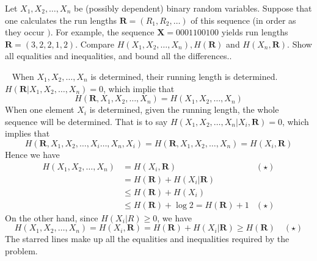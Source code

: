 \begin{exercise}{Let $X_{1}, X_{2}, \ldots, X_{n}$ be (possibly dependent) binary random variables. Suppose that one calculates the run lengths $\mathbf{R}=\left(R_{1}, R_{2}, \ldots\right)$ of this sequence (in order as they occur $) .$ For example, the sequence $\mathbf{X}=0001100100$ yields run lengths $\mathbf{R}=(3,2,2,1,2) .$ Compare $H\left(X_{1}, X_{2}, \ldots, X_{n}\right), H(\mathbf{R})$ and $H\left(X_{n}, \mathbf{R}\right) .$ Show all equalities and inequalities, and bound all the differences.}.
  \begin{solution}
    \par{~}
    When $X_{1}, X_{2}, \ldots, X_{n}$ is determined, their running length is determined. $H\left(\mathbf{R}| X_{1}, X_{2}, \ldots, X_{n}\right) = 0$, which implie that $$H(\mathbf{R},X_{1}, X_{2}, \ldots, X_{n} ) = H(X_{1}, X_{2}, \ldots, X_{n} ) $$
    When one element $X_{i}$ is determined, given the running length, the whole sequence will be determined.  That is to say $H\left(X_{1}, X_{2}, \ldots, X_{n}| X_i , \mathbf{R} \right) = 0$, which implies that 
    $$H(\mathbf{R},X_{1}, X_{2},\ldots, X_{i} \ldots, X_{n}, X_{i} ) = H(\mathbf{R},X_{1}, X_{2}, \ldots, X_{n}) = H(X_i , \mathbf{R}) $$
    Hence we have
    \begin{equation}
      \begin{aligned}
        H(X_{1}, X_{2}, \ldots, X_{n} ) &= H(X_i,\mathbf{R}) & (\star) \\
        &= H(\mathbf{R}) + H(X_i| \mathbf{R}) \\
        &\le H(\mathbf{R}) + H(X_i) \\
        &\le H(\mathbf{R}) + \log 2 =  H(\mathbf{R}) + 1 & (\star)
      \end{aligned}
    \end{equation}
    On the other hand, since $H(X_i|R) \ge 0$, we have
    \begin{equation}
      H(X_{1}, X_{2}, \ldots, X_{n} ) = H(X_i,\mathbf{R})  = H(\mathbf{R}) + H(X_i| \mathbf{R}) \ge H(\mathbf{R}) \quad (\star)
    \end{equation}
    The starred lines make up all the equalities and inequalities required by the problem.
  \end{solution}
  \label{ex31-1}
  \end{exercise}

